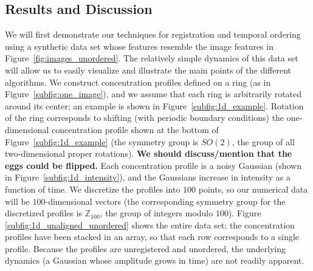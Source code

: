 \documentclass{pnastwo}
\begin{document}
\begin{article}
\section{Results and Discussion}

%
%
%
%


We will first demonstrate our techniques for registration and temporal ordering using a synthetic data set whose features resemble the image features in Figure~\ref{fig:images_unordered}.
%
The relatively simple dynamics of this data set will allow us to easily visualize and illustrate the main points of the different algorithms.
%
We construct concentration profiles defined on a ring (as in Figure~\ref{subfig:one_image}), and we assume that each ring is arbitrarily rotated around its center; an example is shown in Figure~\ref{subfig:1d_example}.
%
Rotation of the ring corresponds to shifting (with periodic boundary conditions) the one-dimensional concentration profile shown at the bottom of Figure~\ref{subfig:1d_example} (the symmetry group is $SO(2)$, the group of all two-dimensional proper rotations).
%
{\bf We should discuss/mention that the eggs could be flipped.}
%
Each concentration profile is a noisy Gaussian (shown in Figure~\ref{subfig:1d_intensity}), and the Gaussians increase in intensity as  a function of time.
%
We discretize the profiles into $100$ points, so our numerical data will be $100$-dimensional vectors (the corresponding symmetry group for the discretized profiles is $\mathbb{Z}_{100}$, the group of integers modulo $100$).
%
Figure \ref{subfig:1d_unaligned_unordered} shows the entire data set; the concentration profiles have been stacked in an array, so that each row corresponds to a single profile.
%
Because the profiles are unregistered and unordered, the underlying dynamics (a Gaussian whose amplitude grows in time) are not readily apparent.


\end{article}
\end{document}
